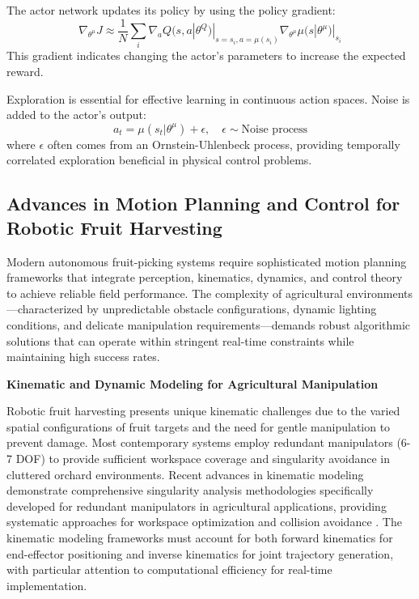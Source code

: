 \documentclass[a4paper,fleqn]{cas-dc}
\begin{document}
The actor network updates its policy by using the policy gradient:
\begin{equation}
\nabla_{\theta^\mu} J \approx \frac{1}{N} \sum_i \nabla_a Q(s, a | \theta^Q)|_{s=s_i, a=\mu(s_i)} \nabla_{\theta^\mu} \mu(s | \theta^\mu)|_{s_i}
\end{equation}
This gradient indicates changing the actor's parameters to increase the expected reward.

Exploration is essential for effective learning in continuous action spaces. Noise is added to the actor's output:
\begin{equation}
a_t = \mu(s_t|\theta^\mu) + \epsilon, \quad \epsilon \sim \text{Noise process}
\end{equation}
where \( \epsilon \) often comes from an Ornstein-Uhlenbeck process, providing temporally correlated exploration beneficial in physical control problems.

\subsection{Advances in Motion Planning and Control for Robotic Fruit Harvesting}
Modern autonomous fruit-picking systems require sophisticated motion planning frameworks that integrate perception, kinematics, dynamics, and control theory to achieve reliable field performance. The complexity of agricultural environments—characterized by unpredictable obstacle configurations, dynamic lighting conditions, and delicate manipulation requirements—demands robust algorithmic solutions that can operate within stringent real-time constraints while maintaining high success rates.

\textbf{Kinematic and Dynamic Modeling for Agricultural Manipulation}

Robotic fruit harvesting presents unique kinematic challenges due to the varied spatial configurations of fruit targets and the need for gentle manipulation to prevent damage. Most contemporary systems employ redundant manipulators (6-7 DOF) to provide sufficient workspace coverage and singularity avoidance in cluttered orchard environments. Recent advances in kinematic modeling demonstrate comprehensive singularity analysis methodologies specifically developed for redundant manipulators in agricultural applications, providing systematic approaches for workspace optimization and collision avoidance . The kinematic modeling frameworks must account for both forward kinematics for end-effector positioning and inverse kinematics for joint trajectory generation, with particular attention to computational efficiency for real-time implementation.
\end{document}
